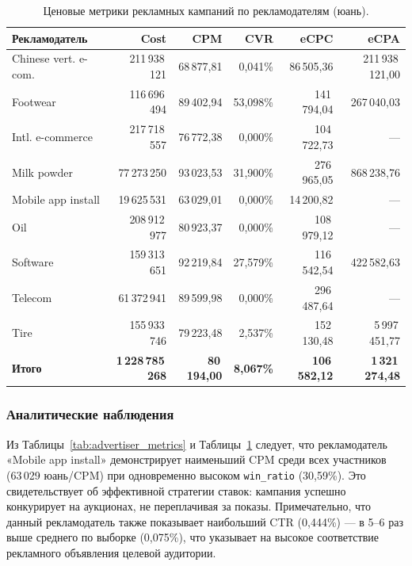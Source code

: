 \begin{table}[h!]
\small
\begin{center}
\caption{Ценовые метрики рекламных кампаний по рекламодателям (юань).}
\label{tab:advertiser_cost_metrics}
\renewcommand{\arraystretch}{1.15}
\begin{tabular}{l|r|r|r|r|r}
  \textbf{Рекламодатель} & \textbf{Cost} & \textbf{CPM} & \textbf{CVR} & \textbf{eCPC} & \textbf{eCPA} \\
  \hline
  Chinese vert. e-com. & 211\,938\,121 & 68\,877,81 & 0,041\%  & 86\,505,36    & 211\,938\,121,00 \\
  Footwear             & 116\,696\,494 & 89\,402,94 & 53,098\% & 141\,794,04   & 267\,040,03      \\
  Intl. e-commerce     & 217\,718\,557 & 76\,772,38 & 0,000\%  & 104\,722,73   & ---              \\
  Milk powder          &  77\,273\,250 & 93\,023,53 & 31,900\% & 276\,965,05   & 868\,238,76      \\
  Mobile app install   &  19\,625\,531 & 63\,029,01 & 0,000\%  &  14\,200,82   & ---              \\
  Oil                  & 208\,912\,977 & 80\,923,37 & 0,000\%  & 108\,979,12   & ---              \\
  Software             & 159\,313\,651 & 92\,219,84 & 27,579\% & 116\,542,54   & 422\,582,63      \\
  Telecom              &  61\,372\,941 & 89\,599,98 & 0,000\%  & 296\,487,64   & ---              \\
  Tire                 & 155\,933\,746 & 79\,223,48 & 2,537\%  & 152\,130,48   & 5\,997\,451,77   \\
  \hline
  \textbf{Итого}       & \textbf{1\,228\,785\,268} & \textbf{80\,194,00} & \textbf{8,067\%} & \textbf{106\,582,12} & \textbf{1\,321\,274,48} \\
\end{tabular}
\end{center}
\end{table}

\subsubsection*{Аналитические наблюдения}

Из Таблицы~\ref{tab:advertiser_metrics} и Таблицы~\ref{tab:advertiser_cost_metrics} следует, что рекламодатель «Mobile app install» демонстрирует наименьший CPM среди всех участников (63\,029 юань/CPM) при одновременно высоком \texttt{win\_ratio} (30,59\%). Это свидетельствует об эффективной стратегии ставок: кампания успешно конкурирует на аукционах, не переплачивая за показы. Примечательно, что данный рекламодатель также показывает наибольший CTR (0,444\%) --- в 5--6 раз выше среднего по выборке (0,075\%), что указывает на высокое соответствие рекламного объявления целевой аудитории.

